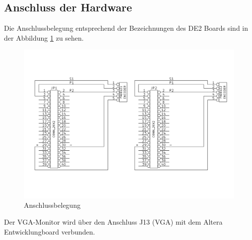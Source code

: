 \documentclass{article}
\begin{document}
\subsection{Anschluss der Hardware}
Die Anschlussbelegung entsprechend der Bezeichnungen des DE2 Boards sind in der Abbildung \ref{fig:Anschlussbelegung} zu sehen.
\begin{figure}[here]
	\begin{center}
		\includegraphics[width=0.65 \textwidth]{includes/Anschlussbelegung.png}
		\caption[Anschlussbelegung]{Anschlussbelegung}
		\label{fig:Anschlussbelegung}
	\end{center}
\end{figure}
\newline
Der VGA-Monitor wird über den Anschluss J13 (VGA) mit dem Altera Entwicklungboard verbunden.

\newpage

\listoffigures
\printindex
\end{document}
